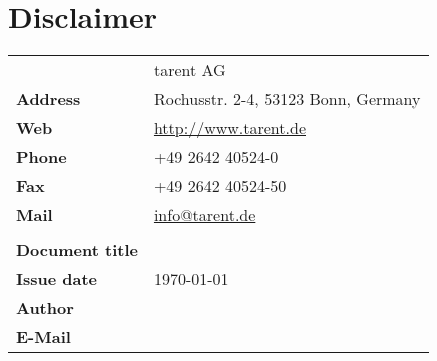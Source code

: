 \section*{Disclaimer}
\begin{center}
\begin{tabular}{>{\bfseries}l l}

& tarent AG\\
Address & Rochusstr. 2-4, 53123 Bonn, Germany\\
Web & \href{http://www.tarent.de}{http://www.tarent.de}\\
Phone & +49 2642 40524-0\\
Fax & +49 2642 40524-50\\
Mail & \href{mailto:info@tarent.de}{info@tarent.de} \\
& \\
Document title & \documenttitle{} \\
Issue date & \today \\
Author & \authorname{} \\
E-Mail & \href{mailto:\authoremail{}}{\authoremail{}} \\

\end{tabular}
\end{center}
